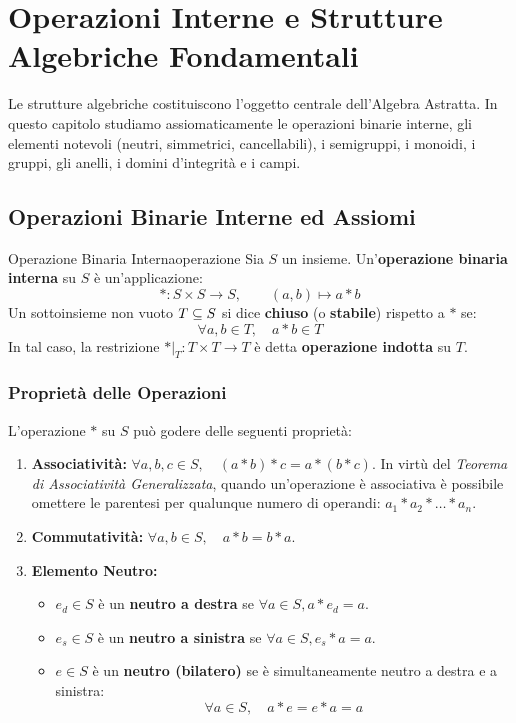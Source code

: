 \chapter{Operazioni Interne e Strutture Algebriche Fondamentali}
\label{chap:strutture_algebriche}

Le strutture algebriche costituiscono l'oggetto centrale dell'Algebra Astratta. In questo capitolo studiamo assiomaticamente le operazioni binarie interne, gli elementi notevoli (neutri, simmetrici, cancellabili), i semigruppi, i monoidi, i gruppi, gli anelli, i domini d'integrità e i campi.

\section{Operazioni Binarie Interne ed Assiomi}

\begin{definizione}{Operazione Binaria Interna}{operazione}
Sia $S$ un insieme. Un'\textbf{operazione binaria interna} su $S$ è un'applicazione:
\[
    * : S \times S \longrightarrow S, \qquad (a, b) \longmapsto a * b
\]
Un sottoinsieme non vuoto $T \subseteq S$ si dice \textbf{chiuso} (o \textbf{stabile}) rispetto a $*$ se:
\[
    \forall a, b \in T, \quad a * b \in T
\]
In tal caso, la restrizione $*|_T : T \times T \to T$ è detta \textbf{operazione indotta} su $T$.
\end{definizione}

\subsection{Proprietà delle Operazioni}
L'operazione $*$ su $S$ può godere delle seguenti proprietà:
\begin{enumerate}
    \item \textbf{Associatività:} $\forall a, b, c \in S, \quad (a * b) * c = a * (b * c)$.
    In virtù del \emph{Teorema di Associatività Generalizzata}, quando un'operazione è associativa è possibile omettere le parentesi per qualunque numero di operandi: $a_1 * a_2 * \dots * a_n$.
    \item \textbf{Commutatività:} $\forall a, b \in S, \quad a * b = b * a$.
    \item \textbf{Elemento Neutro:}
    \begin{itemize}
        \item $e_d \in S$ è un \textbf{neutro a destra} se $\forall a \in S, a * e_d = a$.
        \item $e_s \in S$ è un \textbf{neutro a sinistra} se $\forall a \in S, e_s * a = a$.
        \item $e \in S$ è un \textbf{neutro (bilatero)} se è simultaneamente neutro a destra e a sinistra:
        \[
            \forall a \in S, \quad a * e = e * a = a
        \]
    \end{itemize}
\end{enumerate}

